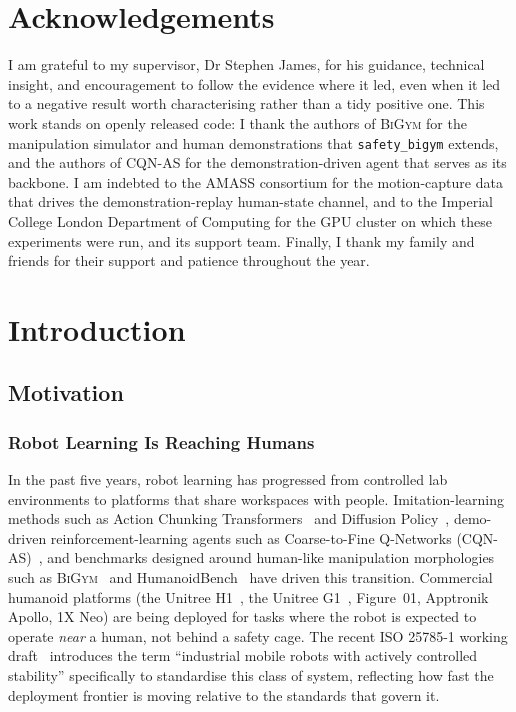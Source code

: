 \documentclass[11pt,a4paper]{report}
\newcommand{\bigym}{\textsc{BiGym}}
\newcommand{\sbigym}{\texttt{safety\_bigym}}
\newcommand{\cqnas}{CQN-AS}
\begin{document}
\chapter*{Acknowledgements}
I am grateful to my supervisor, Dr Stephen James, for his guidance,
technical insight, and encouragement to follow the evidence where it
led, even when it led to a negative result worth characterising rather
than a tidy positive one. This work stands on openly released code: I
thank the authors of \bigym{} for the manipulation simulator and human
demonstrations that \sbigym{} extends, and the authors of \cqnas{} for
the demonstration-driven agent that serves as its backbone. I am
indebted to the \textsc{AMASS} consortium for the motion-capture data
that drives the demonstration-replay human-state channel, and to the Imperial College London
Department of Computing for the GPU cluster on which these experiments
were run, and its support team. Finally, I thank my family and friends
for their support and patience throughout the year.

\chapter{Introduction}
\label{ch:intro}

\section{Motivation}
\label{sec:intro:motivation}

\subsection{Robot Learning Is Reaching Humans}
\label{sec:intro:mot:reaching}

In the past five years, robot learning has progressed from
controlled lab environments to platforms that share workspaces with
people. Imitation-learning methods such as Action Chunking
Transformers~\cite{zhao2023act} and Diffusion
Policy~\cite{chi2023diffusion}, demo-driven reinforcement-learning
agents such as Coarse-to-Fine Q-Networks
(\cqnas{})~\cite{seo2024cqnas}, and benchmarks designed around
human-like manipulation morphologies such as
\bigym{}~\cite{chernyadev2024bigym} and
HumanoidBench~\cite{sferrazza2024humanoidbench} have driven this
transition. Commercial humanoid platforms (the Unitree
H1~\cite{unitree_h1}, the Unitree G1~\cite{unitree_g1}, Figure~01,
Apptronik Apollo, 1X Neo) are being deployed for tasks where the
robot is expected to operate \emph{near} a human, not behind a
safety cage. The recent ISO 25785-1 working draft~\cite{iso25785}
introduces the term ``industrial mobile robots with actively
controlled stability'' specifically to standardise this class of
system, reflecting how fast the deployment frontier is moving
relative to the standards that govern it.
\end{document}
